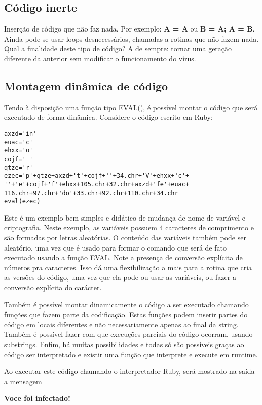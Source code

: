 \subsection{Código inerte}
Inserção de código que não faz nada. Por exemplo: \textbf{A = A} ou \textbf{B = A; A = B}. Ainda pode-se usar loops desnecessários, chamadas a rotinas que não fazem nada. Qual a finalidade deste tipo de código? A de sempre: tornar uma geração diferente da anterior sem modificar o funcionamento do vírus.

\subsection{Montagem dinâmica de código}
Tendo à disposição uma função tipo EVAL(), é possível montar o código que será executado de forma dinâmica. Considere o código escrito em Ruby:


{{{
\renewcommand{\baselinestretch}{1.0}
\begin{verbatim}
axzd='in'
euac='c'
ehxx='o'
cojf=' '
qtze='r'
ezec='p'+qtze+axzd+'t'+cojf+''+34.chr+'V'+ehxx+'c'+
''+'e'+cojf+'f'+ehxx+105.chr+32.chr+axzd+'fe'+euac+
116.chr+97.chr+'do'+33.chr+92.chr+110.chr+34.chr
eval(ezec)
\end{verbatim}
}}}

Este é um exemplo bem simples e didático de mudança de nome de variável e criptografia. Neste exemplo, as variáveis possuem 4 caracteres de comprimento e são formadas por letras aleatórias. O conteúdo das variáveis também pode ser aleatório, uma vez que é usado para formar o comando que será de fato executado usando a função EVAL. Note a presença de conversão explícita de números pra caracteres. Isso dá uma flexibilização a mais para a rotina que cria as versões do código, uma vez que ela pode ou usar as variáveis, ou fazer a conversão explícita do carácter.

Também é possível montar dinamicamente o código a ser executado chamando funções que fazem parte da codificação. Estas funções podem inserir partes do código em locais diferentes e não necessariamente apenas ao final da string. Também é possível fazer com que execuções parciais do código ocorram, usando substrings. Enfim, há muitas possibilidades e todas só são possíveis graças ao código ser interpretado e existir uma função que interprete e execute em runtime.

Ao executar este código chamando o interpretador Ruby, será mostrado na saída a mensagem

\textbf{Voce foi infectado!}
